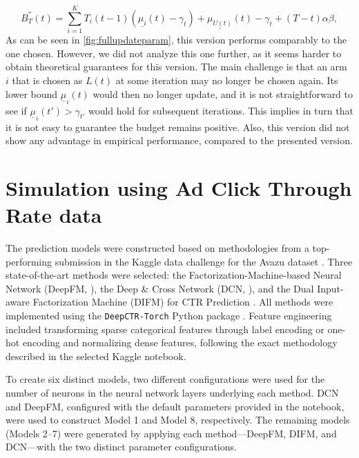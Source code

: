 \begin{APPENDICES}
  \[
B^{''}_{T}(t)=\sum_{i=1}^{K}T_i(t-1)(\underline{\mu_i}(t)-\gamma_t)+\underline{\mu_{U(t)}}(t)-\gamma_t+(T-t)\alpha \beta,
\]
As can be seen in \cref{fig:fullupdateparam}, this version performs comparably to the one chosen. However, we did not analyze this one further, as it seems harder to obtain theoretical guarantees for this version. The main challenge is that an arm $i$ that is chosen as $L(t)$ at some iteration may no longer be chosen again. Its lower bound $\underline{\mu}_i(t)$ would then no longer update, and it is not straightforward to see if $\underline{\mu}_i(t')>\gamma_{t'}$ would hold for subsequent iterations. This implies in turn that it is not easy to guarantee the budget remains positive. Also, this version did not show any advantage in empirical performance, compared to the presented version. 



\section{Simulation using Ad Click Through Rate data}\label{app:simulationrealdata}

The prediction models were constructed based on methodologies from a top-performing submission in the Kaggle data challenge for the Avazu dataset \citep{kaggle_deepctr_difm}. Three state-of-the-art methods were selected: the Factorization-Machine-based Neural Network (DeepFM, \citealt{guo2017deepfmfactorizationmachinebasedneural}), the Deep \& Cross Network (DCN, \citealt{wang2017deepcrossnetwork}), and the Dual Input-aware Factorization Machine (DIFM) for CTR Prediction \citep{Lu2020ADI}. All methods were implemented using the {\tt DeepCTR-Torch} Python package \citep{deepctr_torch}. Feature engineering included transforming sparse categorical features through label encoding or one-hot encoding and normalizing dense features, following the exact methodology described in the selected Kaggle notebook.


To create six distinct models, two different configurations were used for the number of neurons in the neural network layers underlying each method. DCN and DeepFM, configured with the default parameters provided in the notebook, were used to construct Model 1 and Model 8, respectively. The remaining models (Models 2–7) were generated by applying each method—DeepFM, DIFM, and DCN—with the two distinct parameter configurations.


\end{APPENDICES}

